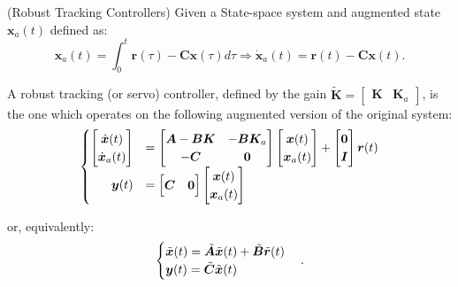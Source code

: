\documentclass[a4paper,11pt]{book}
\numberwithin{figure}{chapter}
\numberwithin{equation}{chapter}
\numberwithin{table}{chapter}
\theoremstyle{definition}
\newtheorem{definition}{Definition}[chapter]
\newcounter{boxed-theorem}
\newcounter{boxed-definition}
\newenvironment{boxed-definition}[1]
{\colorlet{shadecolor}{pastelYellow!15} \begin{shaded} \begin{definition}{#1}}
{\end{definition} \end{shaded}}
\newcounter{boxed-example}
\begin{document}
\begin{boxed-definition}{(Robust Tracking Controllers)} \label{def:robustTracking}
    Given a State-space system and augmented state $\bm{x}_a(t)$ defined as:
    \begin{equation}
        \bm{x}_a(t) = \int_{0}^{t} \bm{r}(\tau) - \bm{C} \bm{x}(\tau) d\tau \Longrightarrow \dot{\bm{x}}_a(t) = \bm{r}(t) - \bm{C} \bm{x}(t)
    .\end{equation}
    
    A robust tracking (or servo) controller, defined by the gain $\tilde{\bm{K}} = \begin{bmatrix} \bm{K} & \bm{K}_a \end{bmatrix}$, is the one which operates on the following augmented version of the original system:
    \begin{align} \label{eq:augmentedSystem}
    \begin{cases}
        \begin{bmatrix}
            \dot{\bm{x}}(t) \\
            \dot{\bm{x}}_a(t)
        \end{bmatrix} &= \begin{bmatrix}
            \bm{A} - \bm{B} \bm{K} & -\bm{B} \bm{K}_a \\ - \bm{C} & \bm{0}
        \end{bmatrix} \begin{bmatrix}
            \bm{x}(t) \\
            \bm{x}_a(t)
        \end{bmatrix} + \begin{bmatrix}
            \bm{0} \\
            \bm{I}
        \end{bmatrix} \bm{r}(t)
        \\
        \hfill \bm{y}(t) &= \begin{bmatrix}
            \bm{C} & \bm{0}
        \end{bmatrix} \begin{bmatrix}
            \bm{x}(t) \\
            \bm{x}_a(t)
        \end{bmatrix}
    \end{cases}
    \end{align}
    
    or, equivalently:
    \begin{align}
    \begin{cases}
        \tilde{\bm{x}}(t) = \tilde{\bm{A}} \tilde{\bm{x}}(t) + \tilde{\bm{B}} \tilde{\bm{r}}(t) \\
        \bm{y}(t) = \tilde{\bm{C}} \tilde{\bm{x}}(t) \hfill
    \end{cases}
    .\end{align}
\end{boxed-definition}
\end{document}
